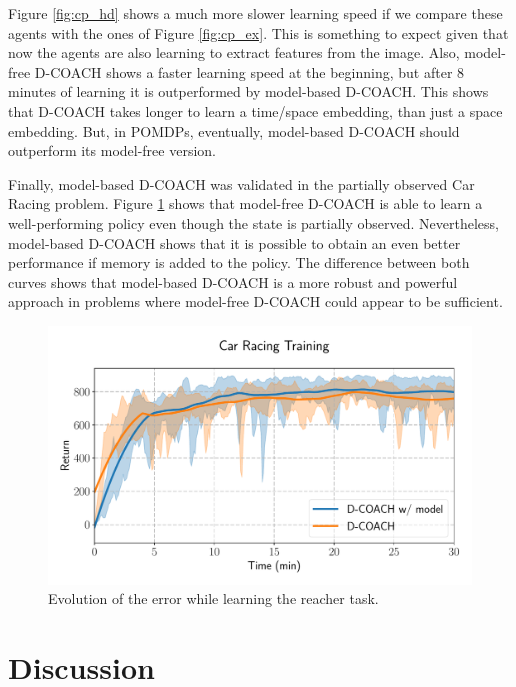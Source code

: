 Figure \ref{fig:cp_hd} shows a much more slower learning speed if we compare these agents with the ones of Figure \ref{fig:cp_ex}. This is something to expect given that now the agents are also learning to extract features from the image. Also, model-free D-COACH shows a faster learning speed at the beginning, but after 8 minutes of learning it is outperformed by model-based D-COACH. This shows that D-COACH takes longer to learn a time/space embedding, than just a space embedding. But, in POMDPs, eventually, model-based D-COACH should outperform its model-free version.

Finally, model-based D-COACH was validated in the partially observed Car Racing problem. Figure \ref{fig:po_cr} shows that model-free D-COACH is able to learn a well-performing policy even though the state is partially observed. Nevertheless, model-based D-COACH shows that it is possible to obtain an even better performance if memory is added to the policy. The difference between both curves shows that model-based D-COACH is a more robust and powerful approach in problems where model-free D-COACH could appear to be sufficient.

\begin{figure}[h]
    \centering
    \includegraphics[width=0.9\linewidth]{imagenes/cap3/car_racing_lstm.pdf}
    \caption{Evolution of the error while learning the reacher task. }
    \label{fig:po_cr}
\end{figure}

\section{Discussion}